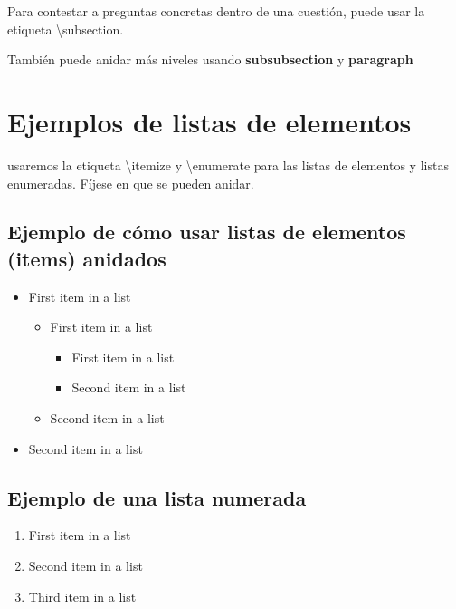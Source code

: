 Para contestar a preguntas concretas dentro de una cuestión, puede usar la etiqueta \textbackslash subsection.

También puede anidar más niveles usando \textbf{subsubsection} y \textbf{paragraph}




\section{Ejemplos de listas de elementos}

usaremos la etiqueta \textbackslash itemize y  \textbackslash enumerate para las listas de elementos y listas enumeradas. Fíjese en que se pueden anidar.


\subsection{Ejemplo de cómo usar listas de elementos (items) anidados}
\begin{itemize}
	\item First item in a list 
		\begin{itemize}
		\item First item in a list 
			\begin{itemize}
			\item First item in a list 
			\item Second item in a list 
			\end{itemize}
		\item Second item in a list 
		\end{itemize}
	\item Second item in a list 
\end{itemize}


\subsection{Ejemplo de una lista numerada}
\begin{enumerate}
\item First item in a list 
\item Second item in a list 
\item Third item in a list
\end{enumerate}

